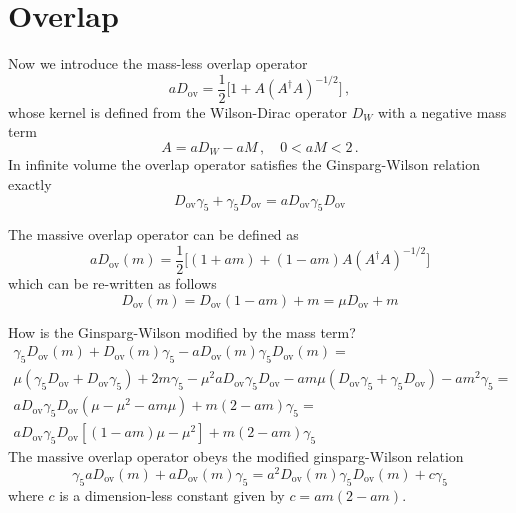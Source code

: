 \documentclass[a4paper]{scrartcl}
\def\Dov{D_\mathrm{ov}}
\begin{document}
\section{Overlap}

Now we introduce the mass-less overlap operator
\begin{equation}
a \Dov = \frac{1}{2} \big[ 1 + A (A^\dagger A)^{-1/2} \big]  \,, 
\end{equation}
whose kernel is defined from the Wilson-Dirac operator $D_W$ with a negative
mass  term
\begin{equation}
A = a D_W - a M \,, \quad 0<aM<2 \,.
\end{equation}
In infinite volume the overlap operator satisfies the Ginsparg-Wilson 
relation exactly
\begin{equation}
\Dov \gamma_5 + \gamma_5 \Dov = a \Dov \gamma_5 \Dov
\end{equation}

The massive overlap operator can be defined as
\begin{equation}
a \Dov(m) = \frac{1}{2} \Big[ (1 + a m) + (1-a m) A (A^\dagger A)^{-1/2} \Big]
\end{equation}
which can be re-written as follows
\begin{equation}
\Dov(m) = \Dov (1- am) + m = \mu \Dov + m
\end{equation}

How is the Ginsparg-Wilson modified by the mass term?
\begin{equation}
\begin{gathered}
\gamma_5 \Dov(m) + \Dov(m) \gamma_5 - a \Dov(m) \gamma_5 \Dov(m) = \\
\mu ( \gamma_5 \Dov + \Dov \gamma_5 ) + 2 m \gamma_5 - \mu^2 a \Dov \gamma_5 \Dov
- am \mu (\Dov \gamma_5 + \gamma_5 \Dov ) - am^2 \gamma_5 = \\  
a \Dov \gamma_5 \Dov (\mu - \mu^2 -a m \mu ) + m(2 - am) \gamma_5 = \\
a \Dov \gamma_5 \Dov [(1-am) \mu - \mu^2] + m(2 - am) \gamma_5
\end{gathered}
\end{equation}
The massive overlap operator obeys the modified ginsparg-Wilson 
relation
\begin{equation}
\gamma_5 a \Dov(m) + a \Dov(m) \gamma_5 = a^2 \Dov(m) \gamma_5 \Dov(m) + c \gamma_5
\end{equation}
where $c$ is a dimension-less constant given by $c=am (2-am)$.
\end{document}
